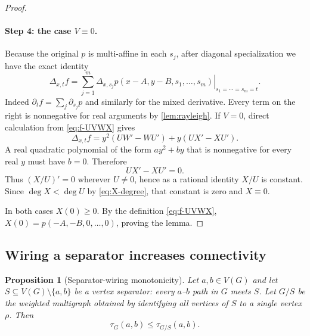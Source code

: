 \documentclass[11pt]{article}
\newtheorem{proposition}[theorem]{Proposition}
\theoremstyle{definition}
\theoremstyle{remark}
\newcommand{\1}{\mathbf 1}
\begin{document}
\begin{proof}
\paragraph{Step 4: the case $V\equiv0$.}
Because the original $p$ is multi-affine in each $s_j$, after diagonal specialization
we have the exact identity
\begin{equation}\label{eq:delta-diagonal}
 \Delta_{x,t}f
 =\sum_{j=1}^m
 \left.\Delta_{x,s_j}p(x-A,y-B,s_1,\dots,s_m)
 \right|_{s_1=\cdots=s_m=t}.
\end{equation}
Indeed $\partial_t f=\sum_j\partial_{s_j}p$ and similarly for the mixed derivative.
Every term on the right is nonnegative for real arguments by
\cref{lem:rayleigh}.  If $V=0$, direct calculation from
\eqref{eq:f-UVWX} gives
\begin{equation}
 \Delta_{x,t}f
 =y^2(UW'-WU')+y(UX'-XU').
\end{equation}
A real quadratic polynomial of the form $ay^2+by$ that is nonnegative for every
real $y$ must have $b=0$.  Therefore
\begin{equation}
 UX'-XU'=0.
\end{equation}
Thus $(X/U)'=0$ wherever $U\neq0$, hence as a rational identity $X/U$ is constant.
Since $\deg X<\deg U$ by \eqref{eq:X-degree}, that constant is zero and
$X\equiv0$.

In both cases $X(0)\ge0$.  By the definition \eqref{eq:f-UVWX},
$X(0)=p(-A,-B,0,\dots,0)$, proving the lemma.
\end{proof}

\subsection{Wiring a separator increases connectivity}

\begin{proposition}[Separator-wiring monotonicity]\label{prop:separator-wiring}
Let $a,b\in V(G)$ and let $S\subseteq V(G)\setminus\{a,b\}$ be a vertex separator:
every $a$--$b$ path in $G$ meets $S$.  Let $G/S$ be the weighted multigraph obtained
by identifying all vertices of $S$ to a single vertex $\rho$.  Then
\begin{equation}\label{eq:separator-wiring}
 \tau_G(a,b)\le \tau_{G/S}(a,b).
\end{equation}
\end{proposition}
\end{document}
